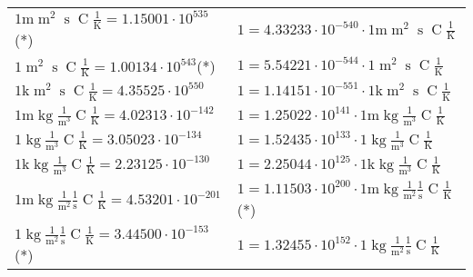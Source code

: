 \begin{center}
\begin{longtable}{l l}
{\color{gray}$1 \bm{\mathrm{ m}}{\operatorname{m}^2}{\operatorname{s}}{\operatorname{C}}\frac1{\operatorname{K}} = 1.15001\cdot10^{535} $}\quad(*) & {\color{gray}$ 1 = 4.33233\cdot10^{-540} \cdot 1 \bm{\mathrm{ m}}{\operatorname{m}^2}{\operatorname{s}}{\operatorname{C}}\frac1{\operatorname{K}}$}  \\
{\color{black}$1 \bm{\mathrm{ }}{\operatorname{m}^2}{\operatorname{s}}{\operatorname{C}}\frac1{\operatorname{K}} = 1.00134\cdot10^{543} $}\quad(*) & {\color{black}$ 1 = 5.54221\cdot10^{-544} \cdot 1 \bm{\mathrm{ }}{\operatorname{m}^2}{\operatorname{s}}{\operatorname{C}}\frac1{\operatorname{K}}$}  \\
{\color{gray}$1 \bm{\mathrm{ k}}{\operatorname{m}^2}{\operatorname{s}}{\operatorname{C}}\frac1{\operatorname{K}} = 4.35525\cdot10^{550} $}   & {\color{gray}$ 1 = 1.14151\cdot10^{-551} \cdot 1 \bm{\mathrm{ k}}{\operatorname{m}^2}{\operatorname{s}}{\operatorname{C}}\frac1{\operatorname{K}}$}  \\
\hline{\color{gray}$1 \bm{\mathrm{ m}}\operatorname{kg}\frac1{\operatorname{m}^3}{}{\operatorname{C}}\frac1{\operatorname{K}} = 4.02313\cdot10^{-142} $}   & {\color{gray}$ 1 = 1.25022\cdot10^{141} \cdot 1 \bm{\mathrm{ m}}\operatorname{kg}\frac1{\operatorname{m}^3}{}{\operatorname{C}}\frac1{\operatorname{K}}$}  \\
{\color{black}$1 \bm{\mathrm{ }}\operatorname{kg}\frac1{\operatorname{m}^3}{}{\operatorname{C}}\frac1{\operatorname{K}} = 3.05023\cdot10^{-134} $}   & {\color{black}$ 1 = 1.52435\cdot10^{133} \cdot 1 \bm{\mathrm{ }}\operatorname{kg}\frac1{\operatorname{m}^3}{}{\operatorname{C}}\frac1{\operatorname{K}}$}  \\
{\color{gray}$1 \bm{\mathrm{ k}}\operatorname{kg}\frac1{\operatorname{m}^3}{}{\operatorname{C}}\frac1{\operatorname{K}} = 2.23125\cdot10^{-130} $}   & {\color{gray}$ 1 = 2.25044\cdot10^{125} \cdot 1 \bm{\mathrm{ k}}\operatorname{kg}\frac1{\operatorname{m}^3}{}{\operatorname{C}}\frac1{\operatorname{K}}$}  \\
{\color{gray}$1 \bm{\mathrm{ m}}\operatorname{kg}\frac1{\operatorname{m}^2}\frac1{\operatorname{s}}{\operatorname{C}}\frac1{\operatorname{K}} = 4.53201\cdot10^{-201} $}   & {\color{gray}$ 1 = 1.11503\cdot10^{200} \cdot 1 \bm{\mathrm{ m}}\operatorname{kg}\frac1{\operatorname{m}^2}\frac1{\operatorname{s}}{\operatorname{C}}\frac1{\operatorname{K}}$}\quad(*)\\
{\color{black}$1 \bm{\mathrm{ }}\operatorname{kg}\frac1{\operatorname{m}^2}\frac1{\operatorname{s}}{\operatorname{C}}\frac1{\operatorname{K}} = 3.44500\cdot10^{-153} $}\quad(*) & {\color{black}$ 1 = 1.32455\cdot10^{152} \cdot 1 \bm{\mathrm{ }}\operatorname{kg}\frac1{\operatorname{m}^2}\frac1{\operatorname{s}}{\operatorname{C}}\frac1{\operatorname{K}}$}  \\

\end{longtable}
\end{center}
